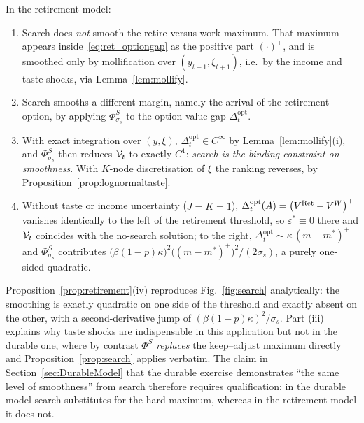 \begin{proposition}
\label{prop:retirement}
In the retirement model:
\begin{enumerate}
    \item Search does \emph{not} smooth the retire-versus-work maximum. That maximum
    appears inside~\eqref{eq:ret_optiongap} as the positive part $(\cdot)^{+}$, and is
    smoothed only by mollification over $(y_{t+1},\xi_{t+1})$, i.e.\ by the income and
    taste shocks, via Lemma~\ref{lem:mollify}.
    \item Search smooths a different margin, namely the arrival of the retirement
    option, by applying $\Phi^{S}_{\sigma_s}$ to the option-value gap
    $\Delta_t^{\mathrm{opt}}$.
    \item With exact integration over $(y,\xi)$, $\Delta_t^{\mathrm{opt}}\in C^{\infty}$
    by Lemma~\ref{lem:mollify}(i), and $\Phi^{S}_{\sigma_s}$ then reduces
    $\mathcal{V}_t$ to exactly $C^{1}$: \emph{search is the binding constraint on
    smoothness}. With $K$-node discretisation of $\xi$ the ranking reverses, by
    Proposition~\ref{prop:lognormaltaste}.
    \item Without taste or income uncertainty ($J=K=1$),
    $\Delta_t^{\mathrm{opt}}(A)=\big(V^{\mathrm{Ret}}-V^{W}\big)^{+}$ vanishes identically to the
    left of the retirement threshold, so $\varepsilon^{\ast}\equiv0$ there and
    $\mathcal{V}_t$ coincides with the no-search solution; to the right,
    $\Delta_t^{\mathrm{opt}}\sim\kappa\,(m-m^{\ast})^{+}$ and
    $\Phi^{S}_{\sigma_s}$ contributes
    $\big(\beta(1-p)\kappa\big)^{2}\big((m-m^{\ast})^{+}\big)^{2}/(2\sigma_s)$, a purely
    one-sided quadratic.
\end{enumerate}
\end{proposition}

Proposition~\ref{prop:retirement}(iv) reproduces Fig.~\ref{fig:search} analytically:
the smoothing is exactly quadratic on one side of the threshold and exactly absent on
the other, with a second-derivative jump of $(\beta(1-p)\kappa)^{2}/\sigma_s$. Part
(iii) explains why taste shocks are indispensable in this application but not in the
durable one, where by contrast $\Phi^{S}$ \emph{replaces} the keep--adjust maximum
directly and Proposition~\ref{prop:search} applies verbatim. The claim in
Section~\ref{sec:DurableModel} that the durable exercise demonstrates ``the same level
of smoothness'' from search therefore requires qualification: in the durable model
search substitutes for the hard maximum, whereas in the retirement model it does not.

